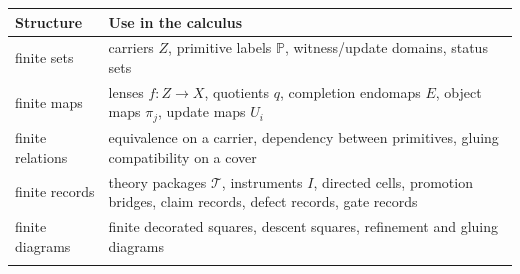 \documentclass[11pt]{article}
\theoremstyle{definition}
\begin{document}
\begin{longtable}[]{@{}ll@{}}
\toprule
\begin{minipage}[b]{0.47\columnwidth}\raggedright
Structure\strut
\end{minipage} & \begin{minipage}[b]{0.47\columnwidth}\raggedright
Use in the calculus\strut
\end{minipage}\tabularnewline
\midrule
\endhead
\begin{minipage}[t]{0.47\columnwidth}\raggedright
finite sets\strut
\end{minipage} & \begin{minipage}[t]{0.47\columnwidth}\raggedright
carriers \(Z\), primitive labels \(\mathbb P\), witness/update domains, status sets\strut
\end{minipage}\tabularnewline
\begin{minipage}[t]{0.47\columnwidth}\raggedright
finite maps\strut
\end{minipage} & \begin{minipage}[t]{0.47\columnwidth}\raggedright
lenses \(f:Z\to X\), quotients \(q\), completion endomaps \(E\), object maps \(\pi_j\), update maps \(U_i\)\strut
\end{minipage}\tabularnewline
\begin{minipage}[t]{0.47\columnwidth}\raggedright
finite relations\strut
\end{minipage} & \begin{minipage}[t]{0.47\columnwidth}\raggedright
equivalence on a carrier, dependency between primitives, gluing compatibility on a cover\strut
\end{minipage}\tabularnewline
\begin{minipage}[t]{0.47\columnwidth}\raggedright
finite records\strut
\end{minipage} & \begin{minipage}[t]{0.47\columnwidth}\raggedright
theory packages \(\mathcal T\), instruments \(I\), directed cells, promotion bridges, claim records, defect records, gate records\strut
\end{minipage}\tabularnewline
\begin{minipage}[t]{0.47\columnwidth}\raggedright
finite diagrams\strut
\end{minipage} & \begin{minipage}[t]{0.47\columnwidth}\raggedright
finite decorated squares, descent squares, refinement and gluing diagrams\strut
\end{minipage}\tabularnewline
\begin{minipage}[t]{0.47\columnwidth}\raggedright

\end{minipage}
\end{longtable}
\end{document}
